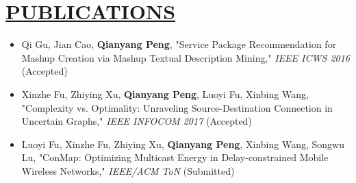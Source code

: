 \documentclass{article}
\begin{document}
\section{\underline{PUBLICATIONS}}
{\begin{itemize}
\item Qi Gu, Jian Cao, \textbf{Qianyang Peng}, "Service Package Recommendation for Mashup Creation via Mashup Textual Description Mining," \emph{IEEE ICWS 2016} (Accepted)
\item Xinzhe Fu, Zhiying Xu, \textbf{Qianyang Peng}, Luoyi Fu, Xinbing Wang, "Complexity vs. Optimality: Unraveling Source-Destination Connection in Uncertain Graphs," \emph{IEEE INFOCOM 2017} (Accepted)
\item Luoyi Fu, Xinzhe Fu, Zhiying Xu, \textbf{Qianyang Peng}, Xinbing Wang, Songwu Lu, "ConMap: Optimizing Multicast Energy in Delay-constrained Mobile Wireless Networks," \emph{IEEE/ACM ToN} (Submitted)
\end{itemize}}\vspace{\parsep}
\end{document}
